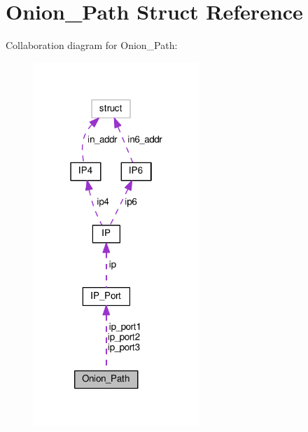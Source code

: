 \hypertarget{struct_onion___path}{\section{Onion\+\_\+\+Path Struct Reference}
\label{struct_onion___path}
}


Collaboration diagram for Onion\+\_\+\+Path\+:\nopagebreak
\begin{figure}[H]
\begin{center}
\leavevmode
\includegraphics[width=178pt]{struct_onion___path__coll__graph}
\end{center}
\end{figure}
